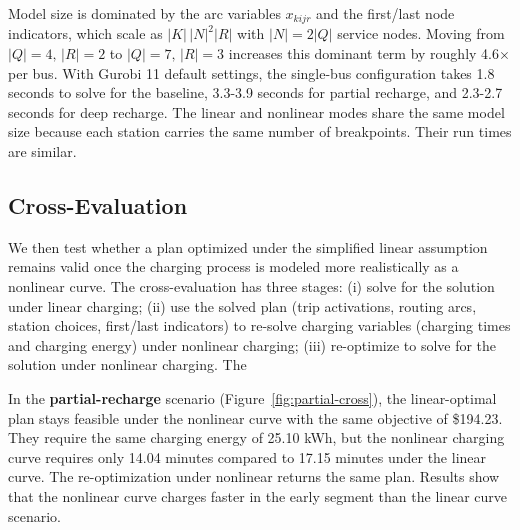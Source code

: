 \documentclass[11pt]{article}
\begin{document}




Model size is dominated by the arc variables \(x_{kijr}\) and the first/last node indicators, which scale as \(|K|\,|N|^{2}|R|\) with \(|N|=2|Q|\) service nodes. Moving from \(|Q|=4,\,|R|=2\) to \(|Q|=7,\,|R|=3\) increases this dominant term by roughly 4.6\(\times\) per bus. With Gurobi 11 default settings, the single-bus configuration takes 1.8 seconds to solve for the baseline, 3.3-3.9 seconds for partial recharge, and 2.3-2.7 seconds for deep recharge. The linear and nonlinear modes share the same model size because each station carries the same number of breakpoints. Their run times are similar. 

\subsection{Cross-Evaluation}
\label{sec:cross-eval}

We then test whether a plan optimized under the simplified linear assumption remains valid once the charging process is modeled more realistically as a nonlinear curve. The cross-evaluation has three stages: (i) solve for the solution under linear charging; (ii) use the solved plan (trip activations, routing arcs, station choices, first/last indicators) to re-solve charging variables (charging times and charging energy) under nonlinear charging; (iii) re-optimize to solve for the solution under nonlinear charging. The 

In the \textbf{partial-recharge} scenario (Figure~\ref{fig:partial-cross}), the linear-optimal plan stays feasible under the nonlinear curve with the same objective of \$194.23. They require the same charging energy of 25.10 kWh, but the nonlinear charging curve requires only 14.04 minutes compared to 17.15 minutes under the linear curve. The re-optimization under nonlinear returns the same plan. Results show that the nonlinear curve charges faster in the early segment than the linear curve scenario.
\end{document}
